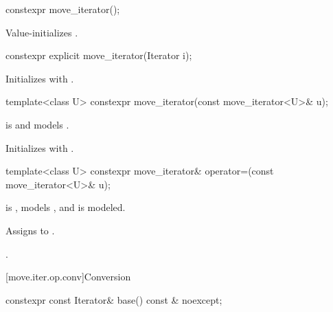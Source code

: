 %
\begin{itemdecl}
constexpr move_iterator();
\end{itemdecl}

\begin{itemdescr}
\pnum
\effects
Value-initializes .
\end{itemdescr}


%
\begin{itemdecl}
constexpr explicit move_iterator(Iterator i);
\end{itemdecl}

\begin{itemdescr}
\pnum
\effects
Initializes  with .
\end{itemdescr}


%
\begin{itemdecl}
template<class U> constexpr move_iterator(const move_iterator<U>& u);
\end{itemdecl}

\begin{itemdescr}
\pnum
\constraints
{} is  and
 models .

\pnum
\effects
Initializes  with .
\end{itemdescr}

%
\begin{itemdecl}
template<class U> constexpr move_iterator& operator=(const move_iterator<U>& u);
\end{itemdecl}

\begin{itemdescr}
\pnum
\constraints
{} is ,
 models , and
 is modeled.

\pnum
\effects
Assigns  to
.

\pnum
\returns
{}.
\end{itemdescr}

[move.iter.op.conv]{Conversion}

%
\begin{itemdecl}
constexpr const Iterator& base() const & noexcept;
\end{itemdecl}

